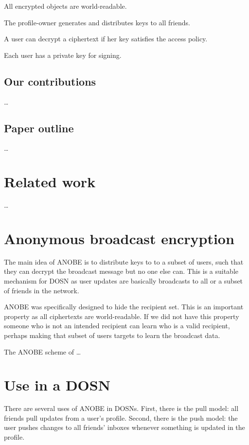 All encrypted objects are world-readable.

The profile-owner generates and distributes keys to all friends.

A user can decrypt a ciphertext if her key satisfies the access policy.

Each user has a private key for signing.

\subsection{Our contributions}

\dots

\subsection{Paper outline}

\dots


\section{Related work}

\dots


\section{Anonymous broadcast encryption}

The main idea of \ac{ANOBE} is to distribute keys to to a subset of users, such 
that they can decrypt the broadcast message but no one else can.
This is a suitable mechanism for \ac{DOSN} as user updates are basically 
broadcasts to all or a subset of friends in the network.

\ac{ANOBE} was specifically designed to hide the recipient set.
This is an important property as all ciphertexts are world-readable.
If we did not have this property someone who is not an intended recipient can 
learn who is a valid recipient, perhaps making that subset of users targets to 
learn the broadcast data.

The \ac{ANOBE} scheme of \cite{anobe} \dots


\section{Use in a \acs{DOSN}}

There are several uses of \ac{ANOBE} in \acp{DOSN}.
First, there is the pull model: all friends pull updates from a user's profile.
Second, there is the push model: the user pushes changes to all friends' 
inboxes whenever something is updated in the profile.

